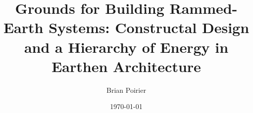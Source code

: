 \documentclass{article}
\begin{document}
\title{Grounds for Building Rammed-Earth Systems: Constructal Design and a Hierarchy of Energy in Earthen Architecture}
\author{Brian Poirier}
\date{\today}
\maketitle
\clearpage



% 


\clearpage

\printbibliography
\end{document}
